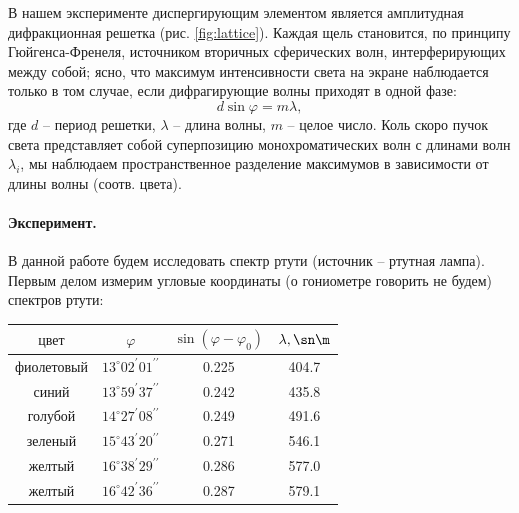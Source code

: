 \documentclass{../lab_class}
\begin{document}
В нашем эксперименте диспергирующим элементом является амплитудная дифракционная решетка (рис. \ref{fig:lattice}). Каждая щель становится, по принципу Гюйгенса-Френеля, источником вторичных сферических волн, интерферирующих между собой; ясно, что максимум интенсивности света на экране наблюдается только в том случае, если дифрагирующие волны приходят в одной фазе:
\begin{equation}\label{eq:main}
	d \sin \varphi = m \lambda,
\end{equation}
где $d$ -- период решетки, $\lambda$ -- длина волны, $m$ -- целое число. Коль скоро пучок света представляет собой суперпозицию монохроматических волн с длинами волн $\lambda_i$, мы наблюдаем пространственное разделение максимумов в зависимости от длины волны (соотв. цвета).

\paragraph{Эксперимент.}
В данной работе будем исследовать спектр ртути (источник -- ртутная лампа). Первым делом измерим угловые координаты (о гониометре говорить не будем) спектров ртути:

\bigskip
\begin{tabular}{|c|c|c|c|}
\hline
$\text{цвет}$ & $\varphi$ & $\sin (\varphi - \varphi_0)$ & $\lambda, \sn \m$ \\
\hline
фиолетовый	&	$13^{\circ}02^{\prime}01^{\prime \prime}$	& 0.225	&	404.7	\\ \hline
синий	&	$13^{\circ}59^{\prime}37^{\prime \prime}$	&	0.242	&	435.8	\\ \hline
голубой	&	$14^{\circ}27^{\prime}08^{\prime \prime}$	&	0.249	&	491.6	\\ \hline
зеленый	&	$15^{\circ}43^{\prime}20^{\prime \prime}$	&	0.271	&	546.1	\\ \hline
желтый	&	$16^{\circ}38^{\prime}29^{\prime \prime}$	&	0.286	&	577.0	\\ \hline
желтый	&	$16^{\circ}42^{\prime}36^{\prime \prime}$	&	0.287	&	579.1	\\ \hline
\end{tabular}
\bigskip

\pagebreak
\end{document}
